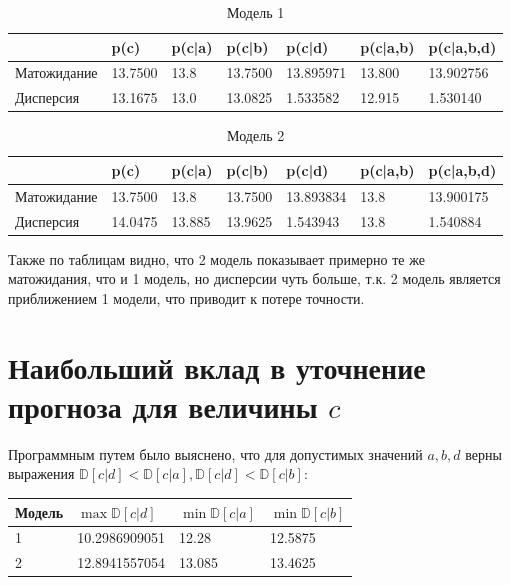 \documentclass[12pt, a4paper]{article}
\begin{document}
            \begin{table}[h]
                \caption{Модель 1}
                \label{tab:m1}
                \begin{tabular}{l | l | l | l | l | l | l}
                & \textbf{p(c)} & \textbf{p(c|a)} & \textbf{p(c|b)} & \textbf{p(c|d)} & \textbf{p(c|a,b)} & \textbf{p(c|a,b,d)} \\
                \hline
                Матожидание & 13.7500 & 13.8 & 13.7500 & 13.895971 & 13.800 & 13.902756 \\
                Дисперсия & 13.1675 & 13.0 & 13.0825 & 1.533582 & 12.915 & 1.530140 \\
                \end{tabular}
            \end{table}

            \begin{table}[h]
                \caption{Модель 2}
                \label{tab:m2}
                \begin{tabular}{l | l | l | l | l | l | l}
                & \textbf{p(c)} & \textbf{p(c|a)} & \textbf{p(c|b)} & \textbf{p(c|d)} & \textbf{p(c|a,b)} & \textbf{p(c|a,b,d)} \\
                \hline
                Матожидание & 13.7500 & 13.8 & 13.7500 & 13.893834 & 13.8 & 13.900175 \\
                Дисперсия & 14.0475 & 13.885 & 13.9625 & 1.543943 & 13.8 & 1.540884 \\
                \end{tabular}
            \end{table}

            Также по таблицам видно, что 2 модель показывает примерно те же матожидания, что и 1 модель, но дисперсии чуть больше, т.к. 2 модель является приближением 1 модели, что приводит к потере точности.

    \section{Наибольший вклад в уточнение прогноза для величины $c$}
        Программным путем было выяснено, что для допустимых значений $a, b, d$ верны выражения $\mathbb{D}[c|d] < \mathbb{D}[c|a], \mathbb{D}[c|d] < \mathbb{D}[c|b]$:
            \begin{center}
            \begin{tabular}{l | l | l | l}
                \textbf{Модель} & $\max{\mathbb{D}[c|d]}$ & $\min{\mathbb{D}[c|a]}$ & $\min{\mathbb{D}[c|b]}$\\
                \hline
                1 & 10.2986909051 & 12.28 & 12.5875\\
                2 & 12.8941557054 & 13.085 & 13.4625\\
            \end{tabular}
            \end{center}
\end{document}

